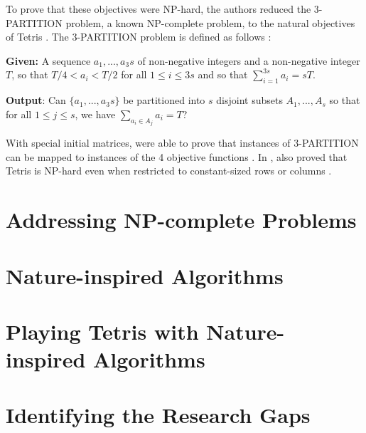 \documentclass[a4paper, 12pt]{extreport}
\begin{document}
				To prove that these objectives were NP-hard, the authors reduced the 3-PARTITION problem, a known NP-complete problem, to the natural objectives of Tetris \cite{tetris-is-hard-even-to-approx}. The 3-PARTITION problem is defined as follows \cite{tetris-is-hard-even-to-approx}:
				
				\noindent \textbf{Given:} A sequence $a_1,...,a_3s$ of non-negative integers and a non-negative integer $T$, so that $T/4 < a_i < T/2$ for all $1 \le i \le 3s$ and so that $\sum_{i=1}^{3s}a_i = sT$.
				
				\noindent \textbf{Output}: Can $\{a_1,...,a_3s\}$ be partitioned into $s$ disjoint subsets $A_1,...,A_s$ so that for all $1 \le j \le s$, we have $\sum_{a_i \in A_j}a_i = T$?
				
				With special initial matrices, \citeauthor{tetris-is-hard-even-to-approx} were able to prove that instances of 3-PARTITION can be mapped to instances of the 4 objective functions \cite{tetris-is-hard-even-to-approx}. In \citeyear{tetris-o1-np-hard}, \citeauthor{tetris-o1-np-hard} also proved that Tetris is NP-hard even when restricted to constant-sized rows or columns \cite{tetris-o1-np-hard}.
			
		\section{Addressing NP-complete Problems}
		
		
		\section{Nature-inspired Algorithms}
		
		
		\section{Playing Tetris with Nature-inspired Algorithms}
		
		
		\section{Identifying the Research Gaps}
		
		
\end{document}

